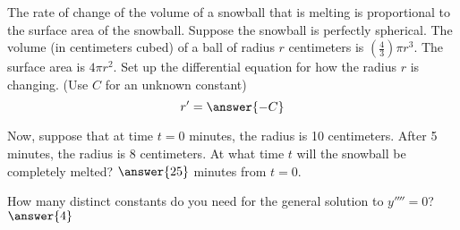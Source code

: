 \documentclass{ximera}
\begin{document}
\begin{exercise}
    The rate of change of the volume of a snowball that is melting is  proportional to the surface area of the snowball.  Suppose the snowball is perfectly spherical.  The volume (in centimeters cubed) of a ball of radius $r$ centimeters is $(\frac{4}{3}) \pi r^3$.  The surface area is $4 \pi r^2$.  Set up the differential equation for how the radius $r$ is changing. (Use $C$ for an unknown constant) 
    \[
        r' = \answer{-C}
    \]    
    \begin{problem}
        Now, suppose that at time $t=0$ minutes, the radius is 10 centimeters. After 5 minutes, the radius is 8 centimeters.  At what time $t$ will the  snowball be completely melted? $\answer{25}$ minutes from $t=0$.
    \end{problem}
\end{exercise}

\begin{exercise}%
    How many distinct constants do you need for the general solution to $y''''= 0$? $\answer{4}$
    
\end{exercise}
%
\end{document}
